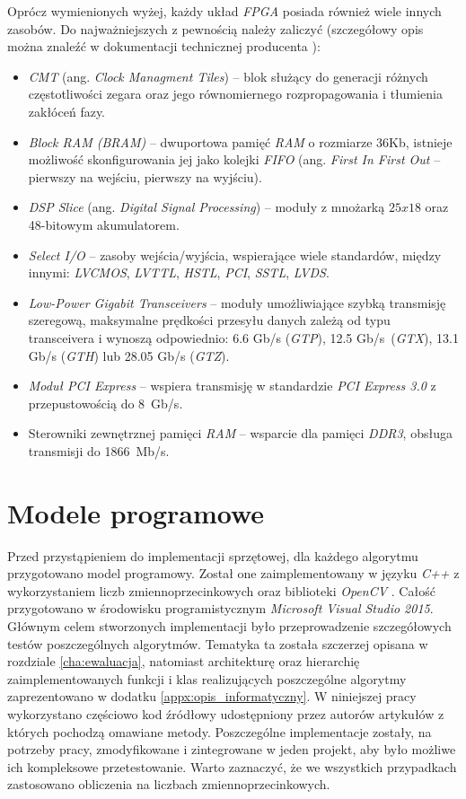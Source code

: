 Oprócz wymienionych wyżej, każdy układ \textit{FPGA} posiada również wiele innych zasobów. 
Do najważniejszych z pewnością należy zaliczyć (szczegółowy opis można znaleźć w dokumentacji technicznej producenta \cite{xilinx_7series_overview}):
    \begin{itemize}[label=$\bullet$]
    \item \textit{CMT} (ang. \textit{Clock Managment Tiles}) -- blok służący do generacji różnych częstotliwości zegara oraz jego równomiernego rozpropagowania i tłumienia zakłóceń fazy.
    \item \textit{Block RAM (BRAM)} -- dwuportowa pamięć \textit{RAM} o rozmiarze 36Kb, istnieje możliwość skonfigurowania jej jako kolejki \textit{FIFO} (ang. \textit{First In First Out} -- pierwszy na wejściu, pierwszy na wyjściu). 
    \item \textit{DSP Slice} (ang. \textit{Digital Signal Processing}) -- moduły z mnożarką $25x18$ oraz 48-bitowym akumulatorem.
    \item \textit{Select I/O} -- zasoby wejścia/wyjścia, wspierające wiele standardów, między innymi: \textit{LVCMOS},
\textit{LVTTL}, \textit{HSTL}, \textit{PCI}, \textit{SSTL}, \textit{LVDS}.
    \item \textit{Low-Power Gigabit Transceivers} -- moduły umożliwiające szybką transmisję szeregową, maksymalne prędkości przesyłu danych zależą od typu transceivera i wynoszą odpowiednio: \num{6.6} Gb/s (\textit{GTP}), \num{12.5} Gb/s~(\textit{GTX}), \num{13.1} Gb/s (\textit{GTH}) lub \num{28.05} Gb/s (\textit{GTZ}).
    \item \textit{Moduł PCI Express} -- wspiera transmisję w standardzie \textit{PCI Express 3.0} z przepustowością do \num{8}~Gb/s.
    \item Sterowniki zewnętrznej pamięci \textit{RAM} -- wsparcie dla pamięci \textit{DDR3}, obsługa transmisji do \num{1866}~Mb/s.
    \end{itemize}


\section{Modele programowe}
\label{sec:modele_programowe}

Przed przystąpieniem do implementacji sprzętowej, dla każdego algorytmu przygotowano model programowy. 
Został one zaimplementowany w języku \textit{C++} z wykorzystaniem liczb zmiennoprzecinkowych oraz biblioteki \textit{OpenCV} \cite{opencv_17}. 
Całość przygotowano w środowisku programistycznym \textit{Microsoft Visual Studio 2015}. 
Głównym celem stworzonych implementacji było przeprowadzenie szczegółowych testów poszczególnych algorytmów. 
Tematyka ta została szczerzej opisana w rozdziale \ref{cha:ewaluacja}, natomiast architekturę oraz hierarchię zaimplementowanych funkcji i klas realizujących poszczególne algorytmy zaprezentowano w dodatku \ref{appx:opis_informatyczny}. W niniejszej pracy wykorzystano częściowo kod źródłowy udostępniony przez autorów artykułów z których pochodzą omawiane metody. Poszczególne implementacje zostały, na potrzeby pracy, zmodyfikowane i zintegrowane w jeden projekt, aby było możliwe ich kompleksowe przetestowanie. Warto zaznaczyć, że we wszystkich przypadkach zastosowano obliczenia na liczbach zmiennoprzecinkowych.



